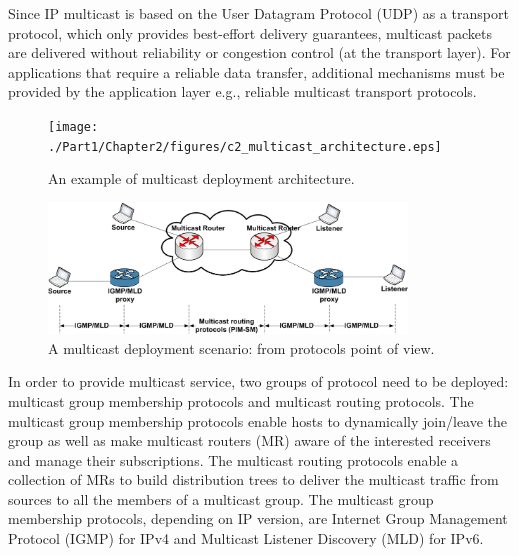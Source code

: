 Since IP multicast is based on the User Datagram Protocol (UDP) as a transport protocol, which only provides best-effort delivery guarantees, multicast packets are delivered without reliability or congestion control (at the transport layer). For applications that require a reliable data transfer, additional mechanisms must be provided by the application layer e.g., reliable multicast transport protocols.
\begin{figure}[h!] 
 \begin{center} 
 \texttt{[image: ./Part1/Chapter2/figures/c2\_multicast\_architecture.eps]} 
    \caption[An example of multicast deployment architecture]{An example of multicast deployment architecture.}
     \label{fig:c2_multicast_architecture}
  \end{center} 
\end{figure}

\begin{figure}[h!] 
 \begin{center} 
 \includegraphics[width=0.85\textwidth]{./Part1/Chapter2/figures/c2_multicast_deployment.eps} 
    \caption[A multicast deployment scenario: from protocols point of view]{A multicast deployment scenario: from protocols point of view.}
     \label{fig:c2_multicast_deployment}
  \end{center} 
\end{figure}

In order to provide multicast service, two groups of protocol need to be deployed: multicast group membership protocols and multicast routing protocols. The multicast group membership protocols enable hosts to dynamically join/leave the group as well as make multicast routers (MR) aware of the interested receivers and manage their subscriptions. The multicast routing protocols enable a collection of MRs to build distribution trees to deliver the multicast traffic from sources to all the members of a multicast group.
The multicast group membership protocols, depending on IP version, are Internet Group Management Protocol (IGMP) \cite{IGMPv3} for IPv4 and Multicast Listener Discovery (MLD) \cite{MLDv2} for IPv6. 

